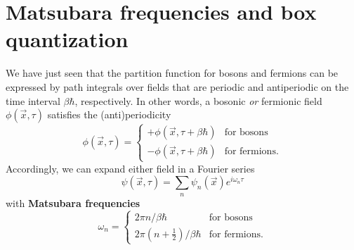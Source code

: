 \section{Matsubara frequencies and box quantization}
\label{sec:matsubara_quantization}

We have just seen that the partition function for bosons and fermions can be expressed by path integrals over fields that are periodic and antiperiodic on the time interval $\beta \hbar$, respectively.
In other words, a bosonic \emph{or} fermionic field $\phi(\vec{x}, \tau)$ satisfies the (anti)periodicity
\begin{equation}
	\phi(\vec{x}, \tau) = \begin{cases}
						      + \phi(\vec{x}, \tau + \beta \hbar) & \text{for bosons} \\
						      - \phi(\vec{x}, \tau + \beta \hbar) & \text{for fermions} .
	                      \end{cases}
\label{eq:tft:periodicity}
\end{equation}
Accordingly, we can expand either field in a Fourier series
\begin{equation}
	\psi(\vec{x}, \tau) = \sum_n \psi_n(\vec{x}) e^{i \omega_n \tau}
\end{equation}
with \textbf{Matsubara frequencies} 
\begin{equation}
	\omega_n = \begin{cases}
			       2 \pi n / \beta \hbar    & \text{for bosons} \\
				   2 \pi (n+\frac12) / \beta \hbar & \text{for fermions} .
	           \end{cases}
\label{eq:tft:matsubara_frequencies}
\end{equation}

